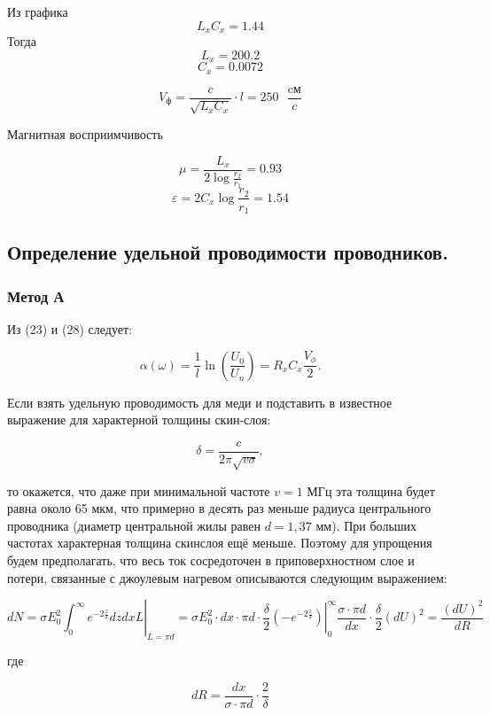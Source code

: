 \documentclass[a4paper,12 pt]{article}
\begin{document}
Из графика 
\[ L_{x} C_{x} = 1.44\]
Тогда
\[L_{x} = 200.2\]
\[C_{x} = 0.0072\]

\[V_{\text{ф}} = \frac{c}{\sqrt{L_{x} C_{x}}} \cdot l = 250 \text{ } \frac{\text{cм}}{c}\]

Магнитная восприимчивость

\[\mu = \frac{L_{x}}{2\log{\frac{r_2}{r_1}}} = 0.93\]
\[\varepsilon = 2C_{x} \log{\frac{r_2}{r_1}} = 1.54\]

\subsection{Определение удельной проводимости проводников.}
\subsubsection{Метод А}


Из (23) и (28) следует:


\begin{equation*}
\alpha(\omega)=\frac{1}{l} \ln \left(\frac{U_{0}}{U_{n}}\right)=R_{x} C_{x} \frac{V_{\phi}}{2} . \tag{33}
\end{equation*}


Если взять удельную проводимость для меди и подставить в известное выражение для характерной толщины скин-слоя:


\begin{equation*}
\delta=\frac{c}{2 \pi \sqrt{v \sigma}}, \tag{34}
\end{equation*}


то окажется, что даже при минимальной частоте $v=1$ МГц эта толщина будет равна около 65 мкм, что примерно в десять раз меньше радиуса центрального проводника (диаметр центральной жилы равен $d=1,37$ мм). При больших частотах характерная толщина скинслоя ещё меньше. Поэтому для упрощения будем предполагать, что весь ток сосредоточен в приповерхностном слое и потери, связанные с джоулевым нагревом описываются следующим выражением:


\begin{equation*}
d N=\left.\sigma E_{0}^{2} \int_{0}^{\infty} e^{-2 \frac{z}{\delta}} d z d x L\right|_{L=\pi d}=\left.\sigma E_{0}^{2} \cdot d x \cdot \pi d \cdot \frac{\delta}{2}\left(-e^{-2 \frac{z}{\delta}}\right)\right|_{0} ^{\infty} \frac{\sigma \cdot \pi d}{d x} \cdot \frac{\delta}{2}(d U)^{2}=\frac{(d U)^{2}}{d R} \tag{35}
\end{equation*}


где


\begin{equation*}
d R=\frac{d x}{\sigma \cdot \pi d} \cdot \frac{2}{\delta} \tag{36}
\end{equation*}
\end{document}
